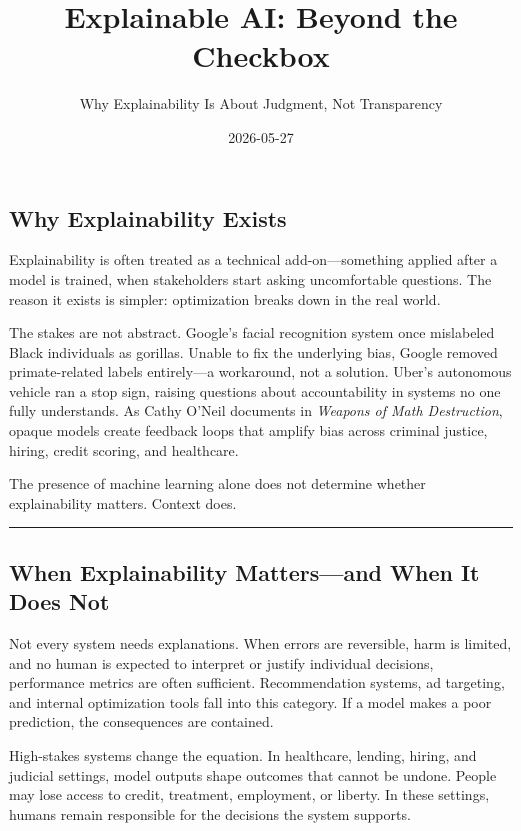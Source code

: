 \documentclass[
  letterpaper,
  DIV=11,
  numbers=noendperiod]{scrartcl}
\title{Explainable AI: Beyond the Checkbox}
\subtitle{Why Explainability Is About Judgment, Not Transparency}
\author{}
\date{2026-05-27}
\renewcommand*\contentsname{Table of contents}
\newcommand\contentsname{Table of contents}
\begin{document}
\maketitle

\renewcommand*\contentsname{Table of contents}
{
\hypersetup{linkcolor=}
\setcounter{tocdepth}{3}
\tableofcontents
}

\subsection{Why Explainability Exists}\label{why-explainability-exists}

Explainability is often treated as a technical add-on---something
applied after a model is trained, when stakeholders start asking
uncomfortable questions. The reason it exists is simpler: optimization
breaks down in the real world.

The stakes are not abstract. Google's facial recognition system once
mislabeled Black individuals as gorillas. Unable to fix the underlying
bias, Google removed primate-related labels entirely---a workaround, not
a solution. Uber's autonomous vehicle ran a stop sign, raising questions
about accountability in systems no one fully understands. As Cathy
O'Neil documents in \emph{Weapons of Math Destruction}, opaque models
create feedback loops that amplify bias across criminal justice, hiring,
credit scoring, and healthcare.

The presence of machine learning alone does not determine whether
explainability matters. Context does.

\begin{center}\rule{0.5\linewidth}{0.5pt}\end{center}

\subsection{When Explainability Matters---and When It Does
Not}\label{when-explainability-mattersand-when-it-does-not}

Not every system needs explanations. When errors are reversible, harm is
limited, and no human is expected to interpret or justify individual
decisions, performance metrics are often sufficient. Recommendation
systems, ad targeting, and internal optimization tools fall into this
category. If a model makes a poor prediction, the consequences are
contained.

High-stakes systems change the equation. In healthcare, lending, hiring,
and judicial settings, model outputs shape outcomes that cannot be
undone. People may lose access to credit, treatment, employment, or
liberty. In these settings, humans remain responsible for the decisions
the system supports.
\end{document}

